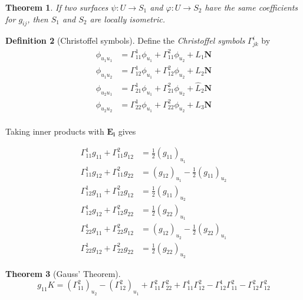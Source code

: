 \documentclass[10pt, oneside, reqno]{amsart}
\newcommand{\christ}[3]{\ensuremath{\Gamma^{#1}_{#2#3}}}
\theoremstyle{plain}%
\newtheorem{thm}{Theorem}[section]
\theoremstyle{definition}
\newtheorem{defn}[thm]{Definition}
\theoremstyle{remark}
\begin{document}
\begin{thm}
    If two surfaces $\psi: U \rightarrow S_1$ and $\varphi: U \rightarrow S_2 $  have the same coefficients for $g_{ij}$, then $S_1$ and $S_2$ are locally isometric.
\end{thm}
\begin{defn}[Christoffel symbols]
    Define the \emph{Christoffel symbols} $\christ{i}{j}{k}$ by 
    \begin{align*}
        \phi_{u_1 u_1} & = \christ{1}{1}{1} \phi_{u_1} + \christ{2}{1}{1} \phi_{u_2} + L_1 \mathbf{N} \\
        \phi_{u_1 u_2} & = \christ{1}{1}{2} \phi_{u_1} + \christ{2}{1}{2} \phi_{u_2} + L_2 \mathbf{N} \\
        \phi_{u_2 u_1} & = \christ{1}{2}{1} \phi_{u_1} + \christ{2}{2}{1} \phi_{u_2} + \hat{L}_2 \mathbf{N}\\
        \phi_{u_2 u_2} & = \christ{1}{2}{2} \phi_{u_1} + \christ{2}{2}{2} \phi_{u_2} + L_3 \mathbf{N}\\
    \end{align*}
    
    Taking inner products with $\mathbf{E_i}$ gives
    
    \begin{align*}
        \christ{1}{1}{1}g_{11} + \christ{2}{1}{1}g_{12} &= \frac{1}{2}(g_{11})_{u_1} \\
            \christ{1}{1}{1}g_{12} + \christ{2}{1}{1}g_{22} &= (g_{12})_{u_1} - \frac{1}{2}(g_{11})_{u_2}\\
                \christ{1}{1}{2}g_{11} + \christ{2}{1}{2}g_{12} &= \frac{1}{2}(g_{11})_{u_2}\\
                    \christ{1}{1}{2}g_{12} + \christ{2}{1}{2}g_{22} &= \frac{1}{2}(g_{22})_{u_1} \\
                        \christ{1}{2}{2}g_{11} + \christ{2}{2}{2}g_{12} &= (g_{12})_{u_2} - \frac{1}{2}(g_{22})_{u_1}\\
                            \christ{1}{2}{2}g_{12} + \christ{2}{2}{2}g_{22} &= \frac{1}{2}(g_{22})_{u_2}
    \end{align*}
\end{defn}

\begin{thm}[Gauss' Theorem]
\[  g_{11}K = (\christ{2}{1}{1})_{u_2} - (\christ{2}{1}{2})_{u_1} + \christ{2}{1}{1} \christ{2}{2}{2} + \christ{1}{1}{1}\christ{2}{1}{2} - \christ{1}{1}{2}\christ{2}{1}{1} - \christ{2}{1}{2}\christ{2}{1}{2}     \]
\end{thm}
\end{document}
